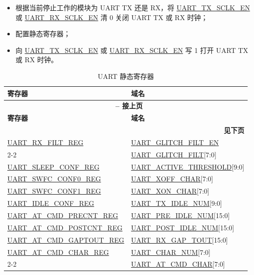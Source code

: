 \documentclass[main\_\_CN.tex]{subfiles}
\begin{document}
\begin{itemize}
    \item 根据当前停止工作的模块为 UART TX 还是 RX，将 \hyperref[fielddesc:UARTTXSCLKEN]{UART\_TX\_SCLK\_EN} 或 \hyperref[fielddesc:UARTRXSCLKEN]{UART\_RX\_SCLK\_EN} 清 0 关闭 UART TX 或 RX 时钟；
    \item 配置静态寄存器；
    \item 向 \hyperref[fielddesc:UARTTXSCLKEN]{UART\_TX\_SCLK\_EN} 或 \hyperref[fielddesc:UARTRXSCLKEN]{UART\_RX\_SCLK\_EN} 写 1 打开 UART TX 或 RX 时钟。
\end{itemize}

\begin{longtable}[c]{|p{6cm}|p{6cm}|}
\caption{UART 静态寄存器}
\label{tab:uart-static-reg} \\
    \hline
    \rowcolor{lightgray}
    \textbf{寄存器} & \textbf{域名} \\\hline
    \endfirsthead

    \multicolumn{2}{c}{\bfseries \tablename\ \thetable{} -- 接上页}\\\hline
    \rowcolor{lightgray}
    \textbf{寄存器} & \textbf{域名} \\\hline
    \endhead

    \multicolumn{2}{r}{\textbf{见下页}} \\
    \endfoot
    \endlastfoot
\hyperref[regdesc:UARTRXFILTREG]{UART\_RX\_FILT\_REG} & \hyperref[fielddesc:UARTGLITCHFILTEN]{UART\_GLITCH\_FILT\_EN} \\\cline{2-2}
 & \hyperref[fielddesc:UARTGLITCHFILT]{UART\_GLITCH\_FILT}[7:0] \\\hline
\hyperref[regdesc:UARTSLEEPCONFREG]{UART\_SLEEP\_CONF\_REG} & \hyperref[fielddesc:UARTACTIVETHRESHOLD]{UART\_ACTIVE\_THRESHOLD}[9:0] \\\hline
\hyperref[regdesc:UARTSWFCCONF0REG]{UART\_SWFC\_CONF0\_REG} & \hyperref[fielddesc:UARTXOFFCHAR]{UART\_XOFF\_CHAR}[7:0] \\\hline
\hyperref[regdesc:UARTSWFCCONF1REG]{UART\_SWFC\_CONF1\_REG} & \hyperref[fielddesc:UARTXONCHAR]{UART\_XON\_CHAR}[7:0] \\\hline
\hyperref[regdesc:UARTIDLECONFREG]{UART\_IDLE\_CONF\_REG} & \hyperref[fielddesc:UARTTXIDLENUM]{UART\_TX\_IDLE\_NUM}[9:0] \\\hline
\hyperref[regdesc:UARTATCMDPRECNTREG]{UART\_AT\_CMD\_PRECNT\_REG} & \hyperref[fielddesc:UARTPREIDLENUM]{UART\_PRE\_IDLE\_NUM}[15:0] \\\hline
\hyperref[regdesc:UARTATCMDPOSTCNTREG]{UART\_AT\_CMD\_POSTCNT\_REG} & \hyperref[fielddesc:UARTPOSTIDLENUM]{UART\_POST\_IDLE\_NUM}[15:0] \\\hline
\hyperref[regdesc:UARTATCMDGAPTOUTREG]{UART\_AT\_CMD\_GAPTOUT\_REG} & \hyperref[fielddesc:UARTRXGAPTOUT]{UART\_RX\_GAP\_TOUT}[15:0] \\\hline
\hyperref[regdesc:UARTATCMDCHARREG]{UART\_AT\_CMD\_CHAR\_REG} & \hyperref[fielddesc:UARTCHARNUM]{UART\_CHAR\_NUM}[7:0] \\\cline{2-2}
 & \hyperref[fielddesc:UARTATCMDCHAR]{UART\_AT\_CMD\_CHAR}[7:0] \\\hline
\end{longtable}
\end{document}
